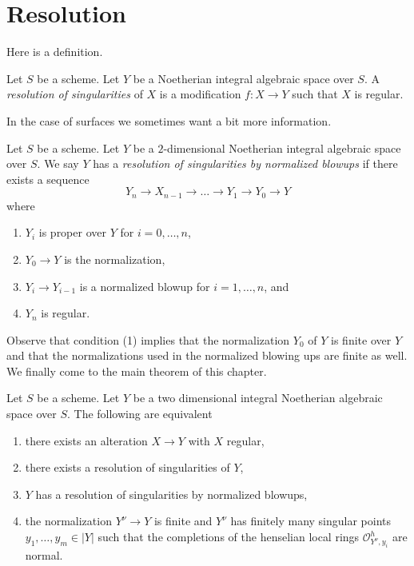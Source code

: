 










\section{Resolution}
\label{section-resolution}

\noindent
Here is a definition.

\begin{definition}
\label{definition-resolution}
Let $S$ be a scheme. Let $Y$ be a Noetherian integral algebraic space over
$S$. A {\it resolution of singularities} of $X$ is a modification
$f : X \to Y$ such that $X$ is regular.
\end{definition}

\noindent
In the case of surfaces we sometimes want a bit more information.

\begin{definition}
\label{definition-resolution-surface}
Let $S$ be a scheme. Let $Y$ be a $2$-dimensional Noetherian integral
algebraic space over $S$. We say $Y$ has a
{\it resolution of singularities by normalized blowups}
if there exists a sequence
$$
Y_n \to X_{n - 1} \to \ldots \to Y_1 \to Y_0 \to Y
$$
where
\begin{enumerate}
\item $Y_i$ is proper over $Y$ for $i = 0, \ldots, n$,
\item $Y_0 \to Y$ is the normalization,
\item $Y_i \to Y_{i - 1}$ is a normalized blowup for $i = 1, \ldots, n$, and
\item $Y_n$ is regular.
\end{enumerate}
\end{definition}

\noindent
Observe that condition (1) implies that the normalization
$Y_0$ of $Y$ is finite over $Y$ and that the normalizations
used in the normalized blowing ups are finite as well.
We finally come to the main theorem of this chapter.

\begin{theorem}
\label{theorem-resolve}
Let $S$ be a scheme. Let $Y$ be a two dimensional integral
Noetherian algebraic space over $S$. The following are equivalent
\begin{enumerate}
\item there exists an alteration $X \to Y$ with $X$ regular,
\item there exists a resolution of singularities of $Y$,
\item $Y$ has a resolution of singularities by normalized blowups,
\item the normalization $Y^\nu \to Y$ is finite and $Y^\nu$ has
finitely many singular points $y_1, \ldots, y_m \in |Y|$ such that the
completions of the henselian local rings $\mathcal{O}_{Y^\nu, y_i}^h$
are normal.
\end{enumerate}
\end{theorem}

